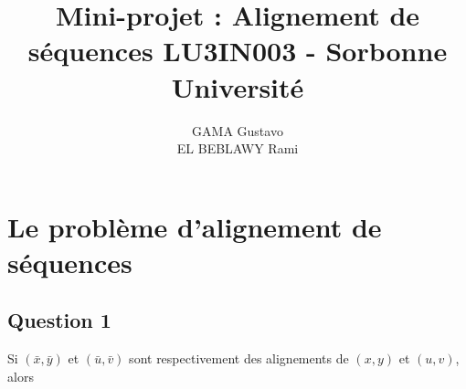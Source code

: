 \documentclass{report}
\title{Mini-projet : Alignement de séquences LU3IN003 - Sorbonne Université}
\author{GAMA Gustavo \\ EL BEBLAWY Rami}
\date{}
\begin{document}
\maketitle

\section*{Le problème d'alignement de séquences}
\subsection*{Question 1}
Si \begin{math}(\bar{x},\bar{y})  \end{math} et \begin{math} (\bar{u},\bar{v}) \end{math} sont
respectivement des alignements de \begin{math}(x,y)\end{math} et \begin{math} (u,v)
\end{math}, alors 
\end{document}
